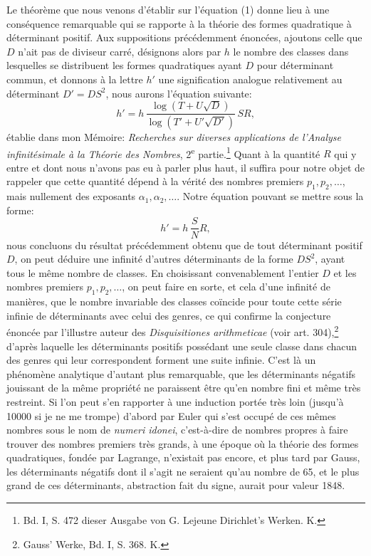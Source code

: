 \documentclass[11pt]{article}
\begin{document}
Le théorème que nous venons d'établir sur l'équation (1) donne lieu à une conséquence remarquable qui se rapporte à la théorie des formes quadratique à déterminant positif. Aux suppositions précédemment énoncées, ajoutons celle que \(D\) n'ait pas de diviseur carré, désignons alors par \(h\) le nombre des classes dans lesquelles se distribuent les formes quadratiques ayant \(D\) pour déterminant commun, et donnons à la lettre \(h'\) une signification analogue relativement au déterminant \(D'=DS^2\), nous aurons l'équation suivante:
\[
h'=h\,\frac{\log(T+U\sqrt D)}{\log(T'+U'\sqrt{D'})}\,SR,
\]
établie dans mon Mémoire: \textit{Recherches sur diverses applications de l'Analyse infinitésimale à la Théorie des Nombres}, 2\textsuperscript{e} partie.\footnote{Bd. I, S. 472 dieser Ausgabe von G. Lejeune Dirichlet's Werken. K.} Quant à la quantité \(R\) qui y entre et dont nous n'avons pas eu à parler plus haut, il suffira pour notre objet de rappeler que cette quantité dépend à la vérité des nombres premiers \(p_1,p_2,\ldots\), mais nullement des exposants \(\alpha_1,\alpha_2,\ldots\). Notre équation pouvant se mettre sous la forme:
\[
h'=h\,\frac{S}{N}R,
\]
nous concluons du résultat précédemment obtenu que de tout déterminant positif \(D\), on peut déduire une infinité d'autres déterminants de la forme \(DS^2\), ayant tous le même nombre de classes. En choisissant convenablement l'entier \(D\) et les nombres premiers \(p_1,p_2,\ldots\), on peut faire en sorte, et cela d'une infinité de manières, que le nombre invariable des classes coïncide pour toute cette série infinie de déterminants avec celui des genres, ce qui confirme la conjecture énoncée par l'illustre auteur des \textit{Disquisitiones arithmeticae} (voir art. 304),\footnote{Gauss' Werke, Bd. I, S. 368. K.} d'après laquelle les déterminants positifs possédant une seule classe dans chacun des genres qui leur correspondent forment une suite infinie. C'est là un phénomène analytique d'autant plus remarquable, que les déterminants négatifs jouissant de la même propriété ne paraissent être qu'en nombre fini et même très restreint. Si l'on peut s'en rapporter à une induction portée très loin (jusqu'à 10000 si je ne me trompe) d'abord par Euler qui s'est occupé de ces mêmes nombres sous le nom de \textit{numeri idonei}, c'est-à-dire de nombres propres à faire trouver des nombres premiers très grands, à une époque où la théorie des formes quadratiques, fondée par Lagrange, n'existait pas encore, et plus tard par Gauss, les déterminants négatifs dont il s'agit ne seraient qu'au nombre de 65, et le plus grand de ces déterminants, abstraction fait du signe, aurait pour valeur 1848.
\end{document}
